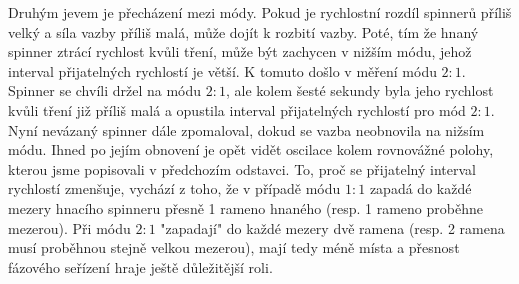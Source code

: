 Druhým jevem je přecházení mezi módy. Pokud je rychlostní rozdíl spinnerů příliš velký a síla vazby příliš malá, může dojít k rozbití vazby. Poté, tím že hnaný spinner ztrácí rychlost kvůli tření, může být zachycen v nižším módu, jehož interval přijatelných rychlostí je větší. K tomuto došlo v měření módu $2:1$. Spinner se chvíli držel na módu $2:1$, ale kolem šesté sekundy byla jeho rychlost kvůli tření již příliš malá a opustila interval přijatelných rychlostí pro mód $2:1$. Nyní nevázaný spinner dále zpomaloval, dokud se vazba neobnovila na nižsím módu. Ihned po jejím obnovení je opět vidět oscilace kolem rovnovážné polohy, kterou jsme popisovali v předchozím odstavci. To, proč se přijatelný interval rychlostí zmenšuje, vychází z toho, že v případě módu $1:1$ zapadá do každé mezery hnacího spinneru přesně 1 rameno hnaného (resp. 1 rameno proběhne mezerou). Při módu $2:1$ "zapadají" do každé mezery dvě ramena (resp. 2 ramena musí proběhnou stejně velkou mezerou), mají tedy méně místa a přesnost fázového seřízení hraje ještě důležitější roli.

\clearpage



